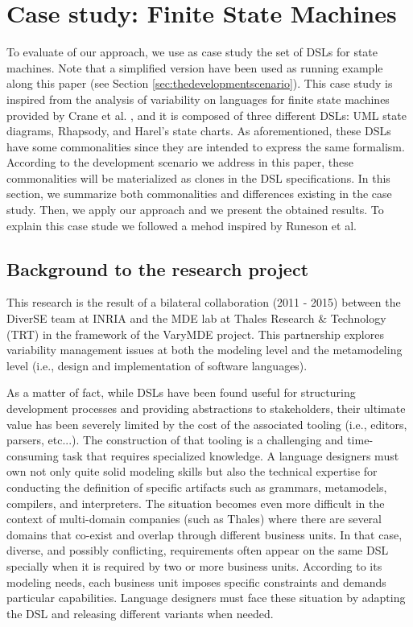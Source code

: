 \section{Case study: Finite State Machines}
\label{sec:validation}

 To evaluate of our approach, we use as case study the set of DSLs for state machines. Note that a simplified version have been used as running example along this paper (see Section \ref{sec:thedevelopmentscenario}). This case study is inspired from the analysis of variability on languages for finite state machines provided by Crane et al. \cite{Crane:2007}, and it is composed of three different DSLs: UML state diagrams, Rhapsody, and Harel's state charts. As aforementioned, these DSLs have some commonalities since they are intended to express the same formalism. According to the development scenario we address in this paper, these commonalities will be materialized as clones in the DSL specifications. In this section, we summarize both commonalities and differences existing in the case study. Then, we apply our approach and we present the obtained results. To explain this case stude we followed a mehod inspired by Runeson et al\cite{runeson-book}.

\subsection{Background to the research project}
This research is the result of a bilateral collaboration (2011 - 2015) between the DiverSE team at INRIA and the MDE lab at Thales Research & Technology (TRT) in the framework of the VaryMDE project. This partnership explores variability management issues at both the modeling level and the metamodeling level (i.e., design and implementation of software languages).

As a matter of fact, while DSLs have been found useful for structuring development processes and providing abstractions to stakeholders, their ultimate value has been severely limited by the cost of the associated tooling (i.e., editors, parsers, etc...). The construction of that tooling is a challenging and time-consuming task that requires specialized knowledge. A language designers must own not only quite solid modeling skills but also the technical expertise for conducting the definition of specific artifacts such as grammars, metamodels, compilers, and interpreters. The situation becomes even more difficult in the context of multi-domain companies (such as Thales) where there are several domains that co-exist and overlap through different business units. In that case, diverse, and possibly conflicting, requirements often appear on the same DSL specially when it is required by two or more business units. According to its modeling needs, each business unit imposes specific constraints and demands particular capabilities. Language designers must face these situation by adapting the DSL and releasing different variants when needed.

